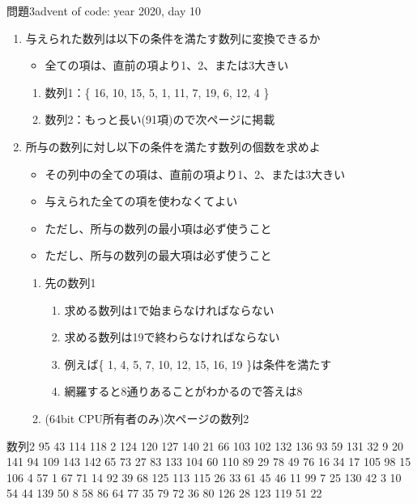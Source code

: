 \documentclass{beamer}
\begin{document}
\begin{frame}[fragile]{問題3}{advent of code: year 2020, day 10}
\begin{enumerate}\itemsep8pt
\item 与えられた数列は以下の条件を満たす数列に変換できるか
\begin{itemize}%
\item 全ての項は、直前の項より1、2、または3大きい
\end{itemize}
\begin{enumerate}%
\item 数列1：\{ 16, 10, 15, 5, 1, 11, 7, 19, 6, 12, 4 \}
\item 数列2：もっと長い(91項)ので次ページに掲載
\end{enumerate}
\item 所与の数列に対し以下の条件を満たす数列の個数を求めよ
\begin{itemize}%
\item その列中の全ての項は、直前の項より1、2、または3大きい
\item 与えられた全ての項を使わなくてよい
\item ただし、所与の数列の最小項は必ず使うこと
\item ただし、所与の数列の最大項は必ず使うこと
\end{itemize}
\begin{enumerate}%
\item 先の数列1
\begin{enumerate}%
\item 求める数列は1で始まらなければならない
\item 求める数列は19で終わらなければならない
\item 例えば\{ 1, 4, 5, 7, 10, 12, 15, 16, 19 \}は条件を満たす
\item 網羅すると8通りあることがわかるので答えは8
\end{enumerate}
\item (64bit CPU所有者のみ)次ページの数列2
\end{enumerate}
\end{enumerate}
\end{frame}

\begin{frame}[fragile]{数列2}{}
95
43
114
118
2
124
120
127
140
21
66
103
102
132
136
93
59
131
32
9
20
141
94
109
143
142
65
73
27
83
133
104
60
110
89
29
78
49
76
16
34
17
105
98
15
106
4
57
1
67
71
14
92
39
68
125
113
115
26
33
61
45
46
11
99
7
25
130
42
3
10
54
44
139
50
8
58
86
64
77
35
79
72
36
80
126
28
123
119
51
22

\end{frame}
\end{document}
